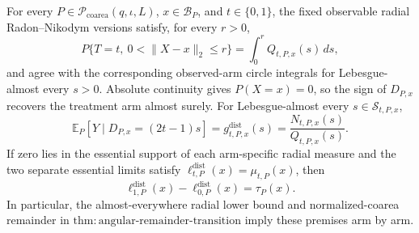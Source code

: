 For every \(P\in\mathcal P_{\mathrm{coarea}}(q,\iota,L)\), \(x\in\mathcal B_P\), and \(t\in\{0,1\}\), the fixed observable radial Radon--Nikodym versions satisfy, for every \(r>0\),
\[
 P\{T=t,\ 0<\lVert X-x\rVert_2\leq r\}
 =\int_0^rQ_{t,P,x}(s)\,ds,
\]
and agree with the corresponding observed-arm circle integrals for Lebesgue-almost every \(s>0\).  Absolute continuity gives \(P(X=x)=0\), so the sign of \(D_{P,x}\) recovers the treatment arm almost surely.  For Lebesgue-almost every \(s\in\mathcal S_{t,P,x}\),
\[
 \mathbb E_P[Y\mid D_{P,x}=(2t-1)s]
 =g^{\mathrm{dist}}_{t,P,x}(s)
 =\frac{N_{t,P,x}(s)}{Q_{t,P,x}(s)}.
\]
If zero lies in the essential support of each arm-specific radial measure and the two separate essential limits satisfy \(\ell^{\mathrm{dist}}_{t,P}(x)=\mu_{t,P}(x)\), then
\[
 \ell^{\mathrm{dist}}_{1,P}(x)-\ell^{\mathrm{dist}}_{0,P}(x)
 =\tau_P(x).
\]
In particular, the almost-everywhere radial lower bound and normalized-coarea remainder in \(\mathrm{thm:angular\text{-}remainder\text{-}transition}\) imply these premises arm by arm.